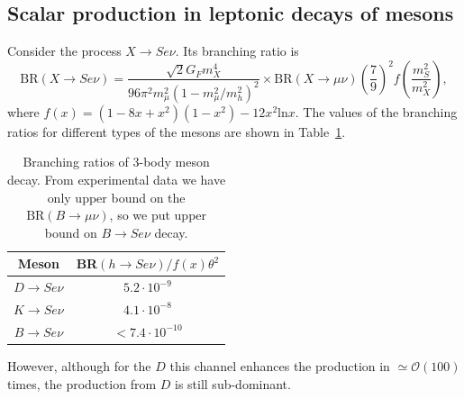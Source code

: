 \documentclass[a4paper,12pt,dvipsnames,usernames]{article}
\begin{document}
\subsection{Scalar production in leptonic decays of mesons}
\label{sec:leptonic-decays}
Consider the process $X \to S e \nu$. Its branching ratio is~\cite{Dawson:1989kr, Cheng:1989ib}
\begin{equation}
    \text{BR} (X \rightarrow S e \nu ) =
  \dfrac{\sqrt{2} G_F m_X^4}{96 \pi^2 m_{\mu}^2 (1 - m_{\mu}^2/m_h^2)^2} 
  \times \text{BR} (X \rightarrow \mu \nu) \left(\frac{7}{9}\right)^2 f\left( \frac{m_S^2}{m_X^2}\right),
\end{equation}
where $f(x) = (1 - 8x + x^2) (1 - x^2) - 12 x^2 \text{ln} x$.
The values of the branching ratios for different types of the mesons are shown in Table~\ref{tab:BR-3-body}.
\begin{table}[h]
\centering
\begin{tabular}{|c|c|}
 \hline  
 Meson  & BR$(h \rightarrow S e \nu )/ f\left( x\right) \theta^2$\\
 \hline
 $D \to  S e \nu$ & $5.2 \cdot 10^{-9}$\\
 $K \rightarrow S e \nu$ & $4.1 \cdot 10^{-8}$ \\
 $B \rightarrow S e \nu$ & $< 7.4 \cdot 10^{-10}$  \\
 \hline
\end{tabular}
    \caption{Branching ratios of 3-body meson decay. From experimental data we have only upper bound on the $\text{BR}(B\to\mu\nu)$, so we put upper bound on $B \rightarrow S e \nu$ decay.}
    \label{tab:BR-3-body}
\end{table}
However, although for the $D$ this channel enhances the production in $\simeq \mathcal{O}(100)$ times, the production from $D$ is still sub-dominant.
\end{document}
